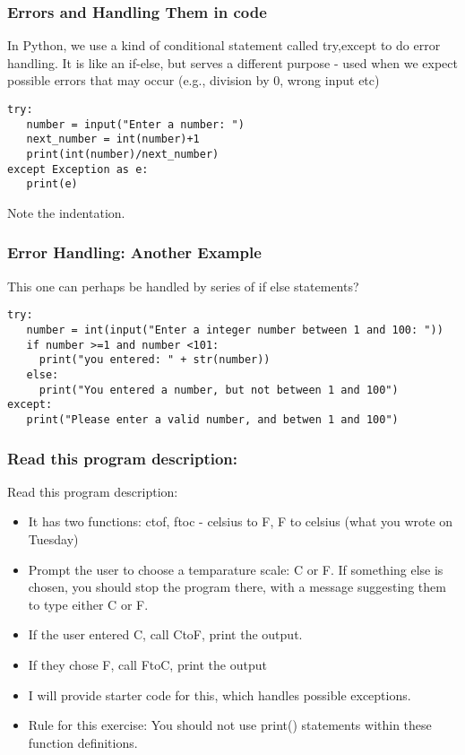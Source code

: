\documentclass{beamer}
\begin{document}
\begin{frame}[fragile]
\frametitle{Errors and Handling Them in code}
In Python, we use a kind of conditional statement called try,except to do error handling. It is like an if-else, but serves a different purpose - used when we expect possible errors that may occur (e.g., division by 0, wrong input etc)
\begin{verbatim}
try:
   number = input("Enter a number: ")
   next_number = int(number)+1
   print(int(number)/next_number)
except Exception as e:
   print(e)
\end{verbatim}
Note the indentation.
\end{frame}

\begin{frame}[fragile]
\frametitle{Error Handling: Another Example}
This one can perhaps be handled by series of if else statements?
\scriptsize
\begin{verbatim}
try:
   number = int(input("Enter a integer number between 1 and 100: "))
   if number >=1 and number <101:
     print("you entered: " + str(number))
   else:
     print("You entered a number, but not between 1 and 100")
except:
   print("Please enter a valid number, and betwen 1 and 100")
\end{verbatim}
\end{frame}

\begin{frame}
\frametitle{Read this program description:}
Read this program description: 
\begin{itemize}
\item It has two functions: ctof, ftoc - celsius to F, F to celsius (what you wrote on Tuesday)
\item Prompt the user to choose a temparature scale: C or F. If something else is chosen, you should stop the program there, with a  message suggesting them to type either C or F.
\item If the user entered C, call CtoF, print the output.
\item If they chose F, call FtoC, print the output
\item I will provide starter code for this, which handles possible exceptions. 
\item Rule for this exercise: You should not use print() statements within these function definitions.
\end{itemize}
\end{frame}
\end{document}
